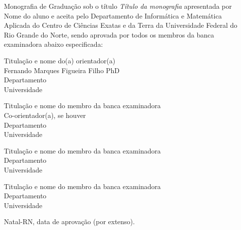 \begin{folhadeaprovacao}
	\setlength{\ABNTsignthickness}{0.4pt}
	\setlength{\ABNTsignwidth}{10cm}
	
	\noindent 
	Monografia de Graduação sob o título \textit{Título da monografia} apresentada por 
	Nome do aluno e aceita pelo Departamento de Informática e Matemática Aplicada do
	Centro de Ciências Exatas e da Terra da Universidade Federal do Rio Grande do Norte,
	sendo aprovada por todos os membros da banca examinadora abaixo especificada:
		
	\assinatura
	{
		Titulação e nome do(a) orientador(a)\\
		{\small Fernando Marques Figueira Filho PhD} 															\\ 
		{\footnotesize
			Departamento 																	\\
		  	Universidade
		}
	}
	
	\assinatura
	{
		Titulação e nome do membro da banca examinadora							\\
		{\small Co-orientador(a), se houver}										\\ 
		{\footnotesize
			Departamento 																	\\
		  	Universidade
		}
	}
		
	\assinatura
	{
		Titulação e nome do membro da banca examinadora 						 \\ 
		{\footnotesize
			Departamento 																	 \\
		  	Universidade
		}
	}
		
	\assinatura
	{
		Titulação e nome do membro da banca examinadora 						 \\ 
		{\footnotesize
			Departamento 																	 \\
		  	Universidade
		}
	}
		
	\vfill
	
	\begin{center}
		Natal-RN, data de aprovação (por extenso).
	\end{center}
\end{folhadeaprovacao}